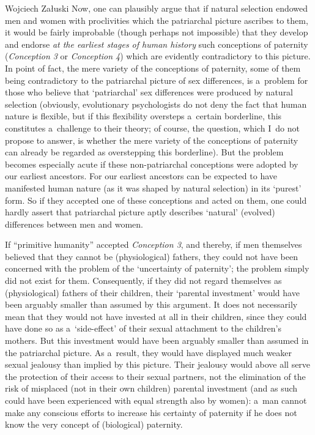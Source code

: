 \begin{artengenv}{Wojciech Załuski}
Now, one can plausibly argue that if natural selection endowed men and women with proclivities which the patriarchal picture ascribes to them, it would be fairly improbable (though perhaps not impossible) that they develop and endorse \textit{at the earliest stages of human history} such conceptions of paternity (\textit{Conception 3} or \textit{Conception 4}) which are evidently contradictory to this picture. In point of fact, the mere variety of the conceptions of paternity, some of them being contradictory to the patriarchal picture of sex differences, is a~problem for those who believe that ‘patriarchal' sex differences were produced by natural selection (obviously, evolutionary psychologists do not deny the fact that human nature is flexible, but if this flexibility oversteps a~certain borderline, this constitutes a~challenge to their theory; of course, the question, which I~do not propose to answer, is whether the mere variety of the conceptions of paternity can already be regarded as overstepping this borderline). But the problem becomes especially acute if these non-patriarchal conceptions were adopted by our earliest ancestors. For our earliest ancestors can be expected to have manifested human nature (as it was shaped by natural selection) in its ‘purest' form. So if they accepted one of these conceptions and acted on them, one could hardly assert that patriarchal picture aptly describes ‘natural' (evolved) differences between men and women.

If ``primitive humanity'' accepted \textit{Conception 3}, and thereby, if men themselves believed that they cannot be (physiological) fathers, they could not have been concerned with the problem of the ‘uncertainty of paternity'; the problem simply did not exist for them. Consequently, if they did not regard themselves as (physiological) fathers of their children, their ‘parental investment' would have been arguably smaller than assumed by this argument. It does not necessarily mean that they would not have invested at all in their children, since they could have done so as a~‘side-effect' of their sexual attachment to the children's mothers. But this investment would have been arguably smaller than assumed in the patriarchal picture. As a~result, they would have displayed much weaker sexual jealousy than implied by this picture. Their jealousy would above all serve the protection of their access to their sexual partners, not the elimination of the risk of misplaced (not in their own children) parental investment (and as such could have been experienced with equal strength also by women): a~man cannot make any conscious efforts to increase his certainty of paternity if he does not know the very concept of (biological) paternity.


\end{artengenv}
